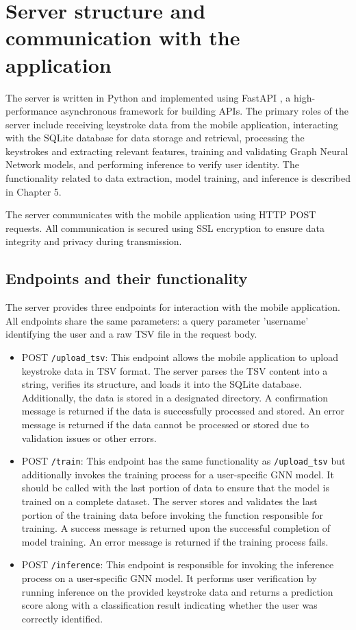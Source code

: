 
\section{Server structure and communication with the application}
The server is written in Python and implemented using FastAPI \cite{fastapi}, a high-performance asynchronous framework for building APIs. The primary roles of the server include receiving keystroke data from the mobile application, interacting with the SQLite database for data storage and retrieval, processing the keystrokes and extracting relevant features, training and validating Graph Neural Network models, and performing inference to verify user identity. The functionality related to data extraction, model training, and inference is described in Chapter 5.

The server communicates with the mobile application using HTTP POST requests. All communication is secured using SSL encryption to ensure data integrity and privacy during transmission.

\subsection{Endpoints and their functionality}
The server provides three endpoints for interaction with the mobile application. All endpoints share the same parameters: a query parameter 'username' identifying the user and a raw TSV file in the request body.
\begin{itemize}
    \item POST \texttt{/upload\_tsv}: This endpoint allows the mobile application to upload keystroke data in TSV format. The server parses the TSV content into a string, verifies its structure, and loads it into the SQLite database. Additionally, the data is stored in a designated directory. A confirmation message is returned if the data is successfully processed and stored. An error message is returned if the data cannot be processed or stored due to validation issues or other errors.
    \item POST \texttt{/train}: This endpoint has the same functionality as \texttt{/upload\_tsv} but additionally invokes the training process for a user-specific GNN model. It should be called with the last portion of data to ensure that the model is trained on a complete dataset. The server stores and validates the last portion of the training data before invoking the function responsible for training. A success message is returned upon the successful completion of model training. An error message is returned if the training process fails.
    \item POST \texttt{/inference}: This endpoint is responsible for invoking the inference process on a user-specific GNN model. It performs user verification by running inference on the provided keystroke data and returns a prediction score along with a classification result indicating whether the user was correctly identified.
\end{itemize}

